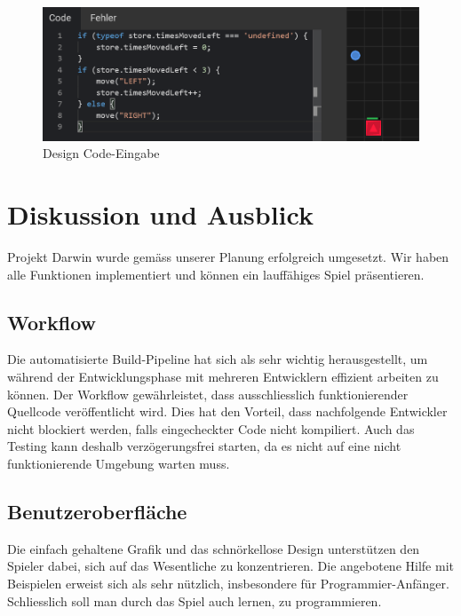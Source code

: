 \documentclass[11pt,a4paper,titlepage]{article}
\begin{document}
\begin{figure}[H]
	\centering
	\includegraphics{game2.png}
	\caption{Design Code-Eingabe}
	\label{code-eingabe}
\end{figure}

\newpage

\section{Diskussion und Ausblick}
%

Projekt Darwin wurde gemäss unserer Planung erfolgreich umgesetzt. Wir haben alle Funktionen implementiert und können ein lauffähiges Spiel präsentieren.

\subsection{Workflow}

Die automatisierte Build-Pipeline hat sich als sehr wichtig herausgestellt, um während der Entwicklungsphase mit mehreren Entwicklern effizient arbeiten zu können. Der Workflow gewährleistet, dass ausschliesslich funktionierender Quellcode veröffentlicht wird. Dies hat den Vorteil, dass nachfolgende Entwickler nicht blockiert werden, falls eingecheckter Code nicht kompiliert. Auch das Testing kann deshalb verzögerungsfrei starten, da es nicht auf eine nicht funktionierende Umgebung warten muss.

\subsection{Benutzeroberfläche}

Die einfach gehaltene Grafik und das schnörkellose Design unterstützen den Spieler dabei, sich auf das Wesentliche zu konzentrieren.
Die angebotene Hilfe mit Beispielen erweist sich als sehr nützlich, insbesondere für Programmier-Anfänger. Schliesslich soll man durch das Spiel auch lernen, zu programmieren.
\end{document}

